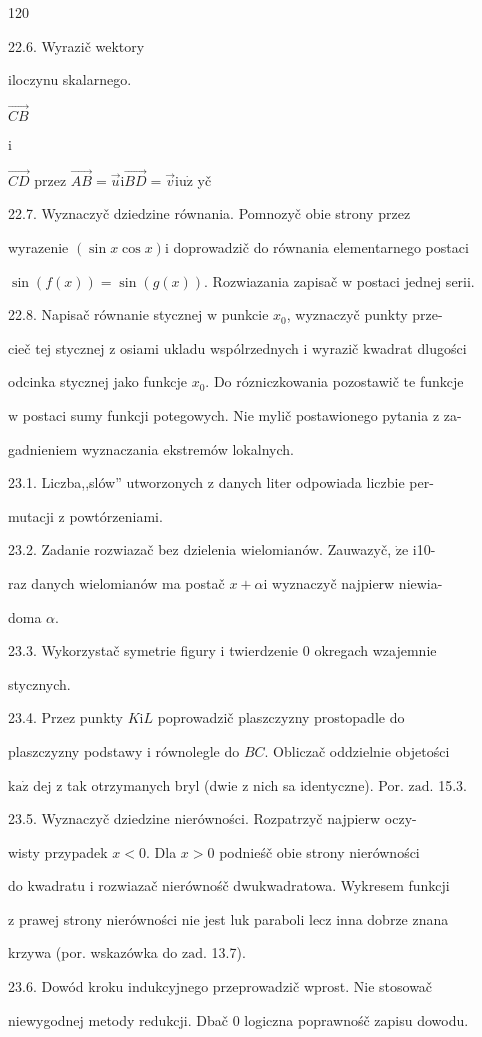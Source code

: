 \documentclass[a4paper,12pt]{article}
\begin{document}
120

22.6. Wyrazič wektory

iloczynu skalarnego.

$\vec{CB}$

i

$\vec{CD}$ przez $\vec{AB}=\vec{u} \mathrm{i} \vec{BD}=\vec{v}\mathrm{i}\mathrm{u}\dot{\mathrm{z}}$ yč

22.7. Wyznaczyč dziedzine równania. Pomnozyč obie strony przez

wyrazenie $(\sin x\cos x) \mathrm{i}$ doprowadzič do równania elementarnego postaci

$\sin(f(x))=\sin(g(x))$. Rozwiazania zapisač $\mathrm{w}$ postaci jednej serii.

22.8. Napisač równanie stycznej $\mathrm{w}$ punkcie $x_{0}$, wyznaczyč punkty prze-

cieč tej stycznej $\mathrm{z}$ osiami ukladu wspólrzednych $\mathrm{i}$ wyrazič kwadrat dlugości

odcinka stycznej jako funkcje $x_{0}$. Do rózniczkowania pozostawič $\mathrm{t}\mathrm{e}$ funkcje

$\mathrm{w}$ postaci sumy funkcji potegowych. Nie mylič postawionego pytania $\mathrm{z}$ za-

gadnieniem wyznaczania ekstremów lokalnych.

23.1. Liczba,,slów'' utworzonych $\mathrm{z}$ danych liter odpowiada liczbie per-

mutacji $\mathrm{z}$ powtórzeniami.

23.2. Zadanie rozwiazač bez dzielenia wielomianów. Zauwazyč, $\dot{\mathrm{z}}\mathrm{e}$ i10-

raz danych wielomianów ma postač $ x+\alpha \mathrm{i}$ wyznaczyč najpierw niewia-

doma $\alpha.$

23.3. Wykorzystač symetrie figury $\mathrm{i}$ twierdzenie $0$ okregach wzajemnie

stycznych.

23.4. Przez punkty $K \mathrm{i} L$ poprowadzič plaszczyzny prostopadle do

plaszczyzny podstawy $\mathrm{i}$ równolegle do $BC$. Obliczač oddzielnie objetości

$\mathrm{k}\mathrm{a}\dot{\mathrm{z}}$ dej $\mathrm{z}$ tak otrzymanych bryl (dwie $\mathrm{z}$ nich sa identyczne). Por. $\mathrm{z}\mathrm{a}\mathrm{d}$. 15.3.

23.5. Wyznaczyč dziedzine nierówności. Rozpatrzyč najpierw oczy-

wisty przypadek $x < 0$. Dla $x > 0$ podnieśč obie strony nierówności

do kwadratu $\mathrm{i}$ rozwiazač nierównośč dwukwadratowa. Wykresem funkcji

$\mathrm{z}$ prawej strony nierówności nie jest luk paraboli lecz inna dobrze znana

krzywa (por. wskazówka do $\mathrm{z}\mathrm{a}\mathrm{d}$. 13.7).

23.6. Dowód kroku indukcyjnego przeprowadzič wprost. Nie stosowač

niewygodnej metody redukcji. Dbač $0$ logiczna poprawnośč zapisu dowodu.
\end{document}

